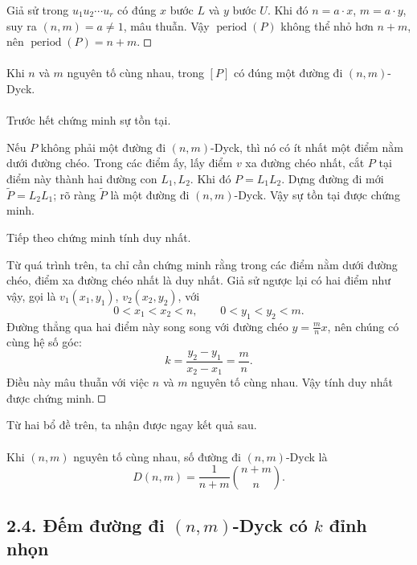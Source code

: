 \documentclass[11pt]{article}
\newcommand{\square}{\mathord{\vcenter{\hrule height .5pt
  \hbox{\vrule width .5pt height 5pt\kern5pt\vrule width .5pt}
  \hrule height .5pt}}}
\begin{document}
Giả sử trong \(u_1u_2\cdots u_r\) có đúng \(x\) bước \(L\) và \(y\) bước
\(U\). Khi đó \(n=a\cdot x\), \(m=a\cdot y\), suy ra \((n,m)=a\ne1\), mâu
thuẫn. Vậy \(\operatorname{period}(P)\) không thể nhỏ hơn \(n+m\), nên
\(\operatorname{period}(P)=n+m\). \(\square\)

\paragraph{}
Khi \(n\) và \(m\) nguyên tố cùng nhau, trong \([P]\) có đúng một đường đi
\((n,m)\)-Dyck.

\paragraph{}
Trước hết chứng minh sự tồn tại.

Nếu \(P\) không phải một đường đi \((n,m)\)-Dyck, thì nó có ít nhất một điểm
nằm dưới đường chéo. Trong các điểm ấy, lấy điểm \(v\) xa đường chéo nhất, cắt
\(P\) tại điểm này thành hai đường con \(L_1,L_2\). Khi đó \(P=L_1L_2\). Dựng
đường đi mới \(\widetilde P=L_2L_1\); rõ ràng \(\widetilde P\) là một đường đi
\((n,m)\)-Dyck. Vậy sự tồn tại được chứng minh.

Tiếp theo chứng minh tính duy nhất.

Từ quá trình trên, ta chỉ cần chứng minh rằng trong các điểm nằm dưới đường
chéo, điểm xa đường chéo nhất là duy nhất. Giả sử ngược lại có hai điểm như
vậy, gọi là \(v_1(x_1,y_1)\), \(v_2(x_2,y_2)\), với
\[
  0<x_1<x_2<n,\qquad 0<y_1<y_2<m.
\]
Đường thẳng qua hai điểm này song song với đường chéo \(y=\frac mnx\), nên
chúng có cùng hệ số góc:
\[
  k=\frac{y_2-y_1}{x_2-x_1}=\frac mn.
\]
Điều này mâu thuẫn với việc \(n\) và \(m\) nguyên tố cùng nhau. Vậy tính duy
nhất được chứng minh. \(\square\)

Từ hai bổ đề trên, ta nhận được ngay kết quả sau.

\paragraph{}
Khi \((n,m)\) nguyên tố cùng nhau, số đường đi \((n,m)\)-Dyck là
\[
  D(n,m)=\frac1{n+m}\binom{n+m}{n}. \tag{5}
\]

\subsection*{2.4. Đếm đường đi \((n,m)\)-Dyck có \(k\) đỉnh nhọn}
\end{document}
